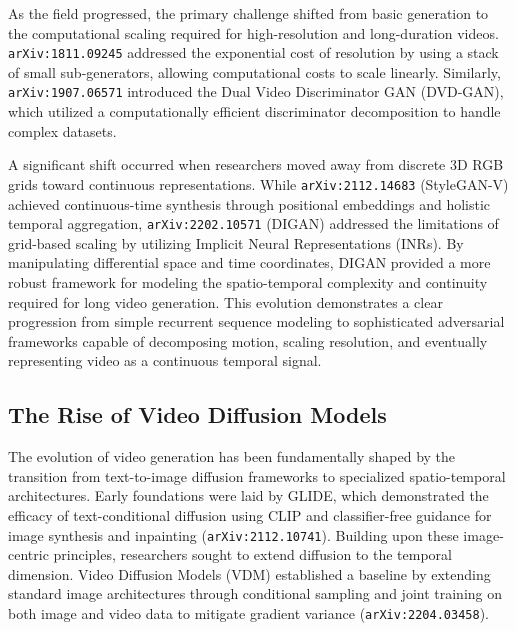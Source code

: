\documentclass[11pt]{article}
\begin{document}
As the field progressed, the primary challenge shifted from basic generation to the computational scaling required for high-resolution and long-duration videos. \texttt{arXiv:1811.09245} addressed the exponential cost of resolution by using a stack of small sub-generators, allowing computational costs to scale linearly. Similarly, \texttt{arXiv:1907.06571} introduced the Dual Video Discriminator GAN (DVD-GAN), which utilized a computationally efficient discriminator decomposition to handle complex datasets.

A significant shift occurred when researchers moved away from discrete 3D RGB grids toward continuous representations. While \texttt{arXiv:2112.14683} (StyleGAN-V) achieved continuous-time synthesis through positional embeddings and holistic temporal aggregation, \texttt{arXiv:2202.10571} (DIGAN) addressed the limitations of grid-based scaling by utilizing Implicit Neural Representations (INRs). By manipulating differential space and time coordinates, DIGAN provided a more robust framework for modeling the spatio-temporal complexity and continuity required for long video generation. This evolution demonstrates a clear progression from simple recurrent sequence modeling to sophisticated adversarial frameworks capable of decomposing motion, scaling resolution, and eventually representing video as a continuous temporal signal.

\subsection{The Rise of Video Diffusion Models}

The evolution of video generation has been fundamentally shaped by the transition from text-to-image diffusion frameworks to specialized spatio-temporal architectures. Early foundations were laid by GLIDE, which demonstrated the efficacy of text-conditional diffusion using CLIP and classifier-free guidance for image synthesis and inpainting (\texttt{arXiv:2112.10741}). Building upon these image-centric principles, researchers sought to extend diffusion to the temporal dimension. Video Diffusion Models (VDM) established a baseline by extending standard image architectures through conditional sampling and joint training on both image and video data to mitigate gradient variance (\texttt{arXiv:2204.03458}).
\end{document}
